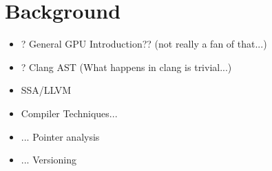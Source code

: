 \chapter{Background}
\begin{itemize}
	\item ? General GPU Introduction?? (not really a fan of that...)
	\item ? Clang AST (What happens in clang is trivial...)
	\item SSA/LLVM
	\item Compiler Techniques...
	\item ... Pointer analysis
	\item ... Versioning

\end{itemize}